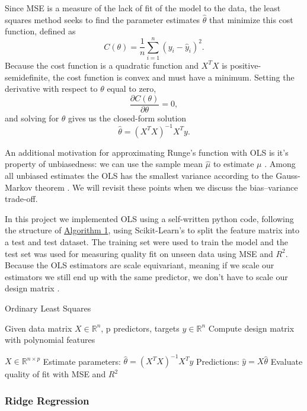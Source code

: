 \documentclass[amssymb,twocolumn,aps]{revtex4}
\begin{document}
Since MSE is a measure of the lack of fit of the model to the data, the least squares method seeks to find the parameter estimates $\hat{\theta}$ that minimize this cost function, defined as
 $$C(\theta)  = \frac{1}{n} \sum_{i=1}^{n} \left( y_i - \hat{y}_i \right)^2.$$
Because the cost function is a quadratic function and $X^TX$ is positive-semidefinite, the cost function is convex and must have a minimum. Setting the derivative with respect to $\theta$ equal to zero, $$\frac{\partial C(\theta)}{\partial \theta} = 0,$$
and solving for $\theta$ gives us the closed-form solution 
$$\hat{\theta} = \left( X^T X \right)^{-1} X^T y.$$

An additional motivation for approximating Runge's function with OLS is it's property of unbiasedness: we can use the sample  mean \textit{$\hat{\mu}$ }to estimate $\mu$ \cite{introstat}. Among all unbiased estimates the OLS has the smallest variance according to the Gauss-Markov theorem \cite{hastie1}. We will revisit these points when we discuss the bias–variance trade-off.

In this project we implemented OLS using a self-written python code, following the structure of \hyperref[algorithm:OLS]{Algorithm 1}, using Scikit-Learn's  \cite{scikit-learn} to split the feature matrix into a test and test dataset. The training set were used to train the model and the test set was used for measuring quality fit on unseen data using MSE and $R^2$. Because the OLS estimators are scale equivariant, meaning if we scale our estimators we still end up with the same predictor, we don't have to scale our design matrix \cite{introstat}.


\begin{algorithm}[H]
    \caption{Ordinary Least Squares}
    \label{algorithm:OLS}
        \begin{algorithmic}[1]
        \State Given data matrix $X \in \mathbb{R}^{n}$, p predictors, targets $y \in \mathbb{R}^n$
        \State Compute design matrix with polynomial features 
        
        $X \in \mathbb{R}^{n \times p}$
        \State Estimate parameters:
        $\hat{\theta} = (X^T X)^{-1} X^T y$
        \State Predictions: $\hat{y} = X \hat{\theta}$
        \State Evaluate quality of fit with MSE and $R^2$
    \end{algorithmic}
\end{algorithm}


\subsubsection{Ridge Regression}
\end{document}
